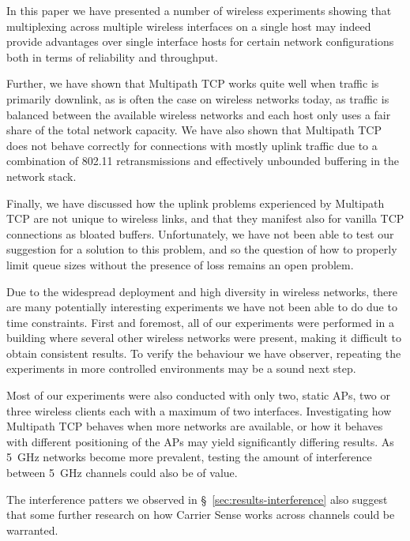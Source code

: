 In this paper we have presented a number of wireless experiments showing that
multiplexing across multiple wireless interfaces on a single host may indeed
provide advantages over single interface hosts for certain network
configurations both in terms of reliability and throughput.

Further, we have shown that Multipath TCP works quite well when traffic is
primarily downlink, as is often the case on wireless networks today, as traffic
is balanced between the available wireless networks and each host only uses a
fair share of the total network capacity. We have also shown that Multipath TCP
does not behave correctly for connections with mostly uplink traffic due to a
combination of 802.11 retransmissions and effectively unbounded buffering in the
network stack.

Finally, we have discussed how the uplink problems experienced by Multipath TCP
are not unique to wireless links, and that they manifest also for vanilla TCP
connections as bloated buffers. Unfortunately, we have not been able to test our
suggestion for a solution to this problem, and so the question of how to
properly limit queue sizes without the presence of loss remains an open problem.

Due to the widespread deployment and high diversity in wireless networks, there
are many potentially interesting experiments we have not been able to do due to
time constraints. First and foremost, all of our experiments were performed in
a building where several other wireless networks were present, making it
difficult to obtain consistent results. To verify the behaviour we have
observer, repeating the experiments in more controlled environments may be a
sound next step.

Most of our experiments were also conducted with only two, static APs, two or
three wireless clients each with a maximum of two interfaces. Investigating how
Multipath TCP behaves when more networks are available, or how it behaves with
different positioning of the APs may yield significantly differing results. As
5~GHz networks become more prevalent, testing the amount of interference between
5~GHz channels could also be of value.

The interference patters we observed in \S~\ref{sec:results-interference} also
suggest that some further research on how Carrier Sense works across channels
could be warranted.
